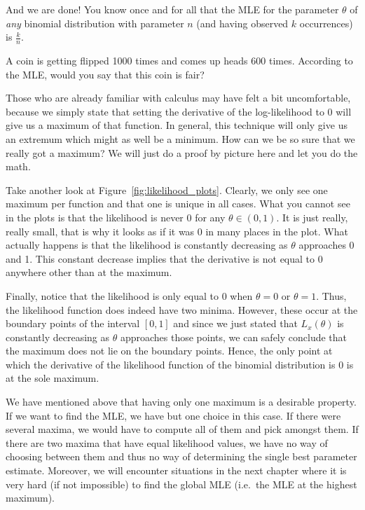 And we are done! You know once and for all that the MLE for the parameter $\theta$ of \emph{any} binomial distribution with parameter $n$ (and having observed $k$ occurrences) is $ \frac{k}{n} $.

\begin{Exercise}
A coin is getting flipped 1000 times and comes up heads 600 times. According to the MLE, would you say that this coin is fair?
\end{Exercise}

Those who are already familiar with calculus may have felt a bit uncomfortable, because we simply state that setting the derivative of the log-likelihood
to 0 will give us a maximum of that function. In general, this technique will only give us an extremum which might as well be a minimum. How can we be so sure that
we really got a maximum? We will just do a proof by picture here and let you do the math. 

Take another look at Figure~\ref{fig:likelihood_plots}. Clearly, we only
see one maximum per function and that one is unique in all cases. 
What you cannot see in the plots is that the likelihood is never 0 for any $ \theta \in (0,1) $. It is just
really, really small, that is why it looks as if it was 0 in many places in the plot. What actually happens is that the likelihood is constantly decreasing as
$ \theta $ approaches 0 and 1. This constant decrease implies that the derivative is not equal to $ 0 $ anywhere other than at the maximum.

Finally, notice that the likelihood is only equal to 0 when $ \theta = 0 $ or $ \theta = 1 $. 
Thus, the likelihood function does indeed have two minima. However, these 
occur at the boundary points of the interval $ [0,1] $ and since we just stated that $ L_{x}(\theta) $ is constantly decreasing as $ \theta $ approaches those points,
we can safely conclude that the maximum does not lie on the boundary points. Hence, the only point at which the
derivative of the likelihood function of the binomial distribution is $ 0 $ is at the sole maximum.

We have mentioned above that having only one maximum is a desirable property. If we want to find the MLE, we have but one choice in this case. If there were
several maxima, we would have to compute all of them and pick amongst them. If there are two maxima that have equal likelihood values, we have no way of choosing
between them and thus no way of determining the single best parameter estimate. Moreover, we will encounter situations in the next chapter where it is very hard (if not
impossible) to find the global MLE (i.e.\ the MLE at the highest maximum).

